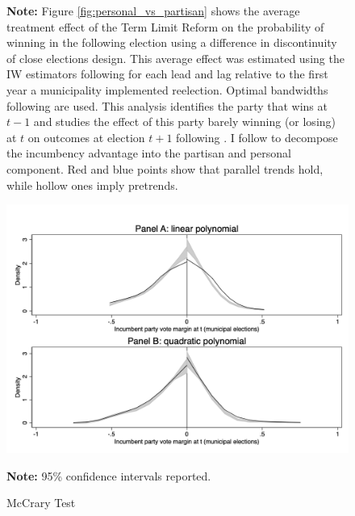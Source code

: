 \documentclass[12pt]{amsart}
\numberwithin{equation}{section}
\theoremstyle{definition}
\theoremstyle{definition}
\theoremstyle{definition}
\begin{document}
\begin{appendix}
\begin{figure}[h]
 \textbf{Note:} Figure \ref{fig:personal_vs_partisan} shows the average treatment effect of the Term Limit Reform on the probability of winning in the following election using a difference in discontinuity of close elections design. This average effect was estimated using the IW estimators following \citet{abraham_sun_2020} for each lead and lag relative to the first year a municipality implemented reelection. Optimal bandwidths following \citet{calonicoetal_2014} are used. This analysis identifies the party that wins at $t-1$ and studies the effect of this party barely winning (or losing) at $t$ on outcomes at election $t+1$ following \citet{klasnja_titiunik_2017}. I follow \citet{fowler_hall_2014} to decompose the incumbency advantage into the partisan and personal component. Red and blue points show that parallel trends hold, while hollow ones imply pretrends. 
\end{figure}  
    
    
\begin{figure}[h]   
\centering
 \caption{McCrary Test}
 \label{fig:mcrary}
\includegraphics[width=1\textwidth]{../Figures_incumbency/mccrary_pol1_2.png}

       \captionsetup{justification=centering}
         
 \textbf{Note:} 95\% confidence intervals reported.
 
\end{figure} 


\end{appendix}
\end{document}
